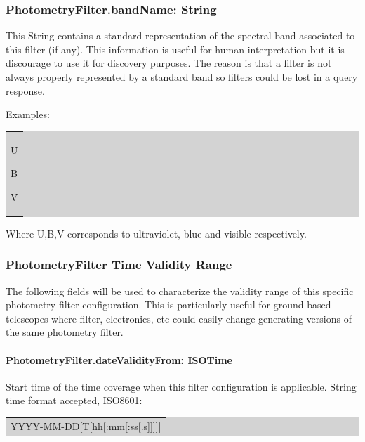 \documentclass[11pt,a4paper]{ivoa}
\begin{document}
\subsubsection{PhotometryFilter.bandName: String}
This String contains a standard representation of the spectral band associated to this filter (if any). This information is useful for human interpretation but it is discourage to use it for discovery purposes. The reason is that a filter is not always properly represented by a standard band so filters could be lost in a query response.
\par

Examples:
\par


\bigskip
\begingroup\setlength{\fboxsep}{0pt}
\colorbox{lightgray}{%
\begin{tabular}{|p{5.53in}|}
U \par B  \par V
\end{tabular}%
}\endgroup
\par
\bigskip


Where U,B,V corresponds to ultraviolet, blue and visible respectively.
\par

\subsubsection{PhotometryFilter Time Validity Range}
The following fields will be used to characterize the validity range of this specific photometry filter configuration. This is particularly useful for ground based telescopes where filter, electronics, etc could easily change generating versions of the same photometry filter.
\par

\paragraph{PhotometryFilter.dateValidityFrom: ISOTime}
Start time of the time coverage when this filter configuration is applicable. String time format accepted, ISO8601:\par

\bigskip
\par
\begingroup\setlength{\fboxsep}{0pt}
\colorbox{lightgray}{%
\begin{tabular}{|p{5.53in}|}
YYYY-MM-DD[T[hh[:mm[:ss[.s]]]]]
\end{tabular}%
}\endgroup
\par
\bigskip
\end{document}
